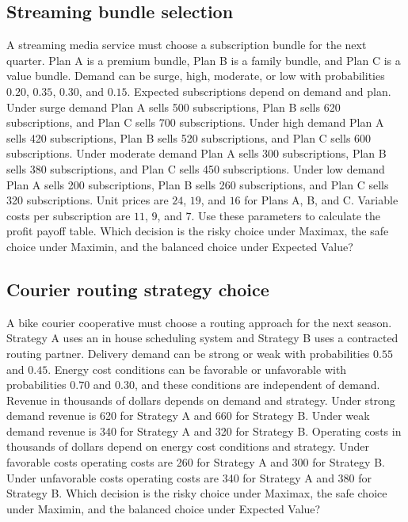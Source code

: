 \begin{ExamProblems}
		\subsection*{Streaming bundle selection}
		A streaming media service must choose a subscription bundle for the next quarter. Plan A is a premium bundle, Plan B is a family bundle, and Plan C is a value bundle. Demand can be surge, high, moderate, or low with probabilities $0.20$, $0.35$, $0.30$, and $0.15$. Expected subscriptions depend on demand and plan. Under surge demand Plan A sells 500 subscriptions, Plan B sells 620 subscriptions, and Plan C sells 700 subscriptions. Under high demand Plan A sells 420 subscriptions, Plan B sells 520 subscriptions, and Plan C sells 600 subscriptions. Under moderate demand Plan A sells 300 subscriptions, Plan B sells 380 subscriptions, and Plan C sells 450 subscriptions. Under low demand Plan A sells 200 subscriptions, Plan B sells 260 subscriptions, and Plan C sells 320 subscriptions. Unit prices are $24$, $19$, and $16$ for Plans A, B, and C. Variable costs per subscription are $11$, $9$, and $7$. Use these parameters to calculate the profit payoff table. Which decision is the risky choice under Maximax, the safe choice under Maximin, and the balanced choice under Expected Value?

		\item
		\subsection*{Courier routing strategy choice}
		A bike courier cooperative must choose a routing approach for the next season. Strategy A uses an in house scheduling system and Strategy B uses a contracted routing partner. Delivery demand can be strong or weak with probabilities $0.55$ and $0.45$. Energy cost conditions can be favorable or unfavorable with probabilities $0.70$ and $0.30$, and these conditions are independent of demand. Revenue in thousands of dollars depends on demand and strategy. Under strong demand revenue is 620 for Strategy A and 660 for Strategy B. Under weak demand revenue is 340 for Strategy A and 320 for Strategy B. Operating costs in thousands of dollars depend on energy cost conditions and strategy. Under favorable costs operating costs are 260 for Strategy A and 300 for Strategy B. Under unfavorable costs operating costs are 340 for Strategy A and 380 for Strategy B. Which decision is the risky choice under Maximax, the safe choice under Maximin, and the balanced choice under Expected Value?


\end{ExamProblems}
